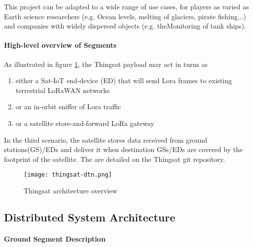 
This project can be adapted to a wide range of use cases, for players as varied
as Earth science researchers (e.g. Ocean levels, melting of glaciers, pirate
fishing...) and companies with widely dispersed objects (e.g. theMonitoring of
tank ships). 


\paragraph*{High-level overview of Segments}

As illustrated in figure \ref{fig:archi}, the Thingsat payload may act in turns as 
\begin{enumerate}
    \item either a Sat-IoT end-device (ED) that will send Lora frames to existing terrestrial LoRaWAN networks
    \item or an in-orbit sniffer of Lora traffic
    \item or a satellite store-and-forward LoRa gateway
\end{enumerate}

In the third scenario, the satellite stores data received from ground
stations(GS)/EDs and deliver it when destination GSs/EDs are covered by the
footprint of the satellite. The %
are detailed on the Thingsat git repository. 


\begin{figure}[h]
    \centering
    \texttt{[image: thingsat-dtn.png]}
    \caption{Thingsat architecture overview}
    \label{fig:archi}
\end{figure}

\subsection{Distributed System Architecture}
\paragraph*{Ground Segment Description}
